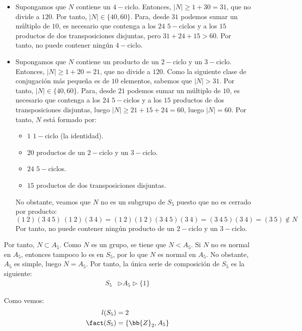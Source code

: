 \begin{ejercicio}
\begin{enumerate}
\begin{itemize}
            \item Supongamos que $N$ contiene un $4-$ciclo. Entonces, $|N|\geq 1+30=31$, que no divide a $120$. Por tanto, $|N|\in \{40,60\}$. Para, desde $31$ podemos sumar un múltiplo de $10$, es necesario que contenga a los $24$ $5-$ciclos y a los $15$ productos de dos transposiciones disjuntas, pero $31+24+15>60$. Por tanto, no puede contener ningún $4-$ciclo.
            

            \item Supongamos que $N$ contiene un producto de un $2-$ciclo y un $3-$ciclo. Entonces, $|N|\geq 1+20=21$, que no divide a $120$. Como la siguiente clase de conjugación más pequeña es de $10$ elementos, sabemos que $|N|>31$. Por tanto, $|N|\in \{40,60\}$. Para, desde $21$ podemos sumar un múltiplo de $10$, es necesario que contenga a los $24$ $5-$ciclos y a los $15$ productos de dos transposiciones disjuntas, luego $|N|\geq 21+15+24=60$, luego $|N|=60$. Por tanto, $N$ está formado por:
            \begin{itemize}
                \item $1$ $1-$ciclo (la identidad).
                \item $20$ productos de un $2-$ciclo y un $3-$ciclo.
                \item $24$ $5-$ciclos.
                \item $15$ productos de dos transposiciones disjuntas.
            \end{itemize}

            No obstante, veamos que $N$ no es un subgrupo de $S_5$ puesto que no es cerrado por producto:
            \begin{equation*}
                (1\ 2)(3\ 4\ 5)\ (1\ 2)(3\ 4) = (1\ 2)(1\ 2)(3\ 4\ 5)(3\ 4)
                = (3\ 4\ 5)(3\ 4) = (3\ 5)\notin N
            \end{equation*}
            Por tanto, no puede contener ningún producto de un $2-$ciclo y un $3-$ciclo.
        \end{itemize}
        Por tanto, $N\subset A_5$. Como $N$ es un grupo, se tiene que $N<A_5$. Si $N$ no es normal en $A_5$, entonces tampoco lo es en $S_5$, por lo que $N$ es normal en $A_5$. No obstante, $A_5$ es simple, luego $N=A_5$.
        Por tanto, la única serie de composición de $S_5$ es la siguiente:
        \begin{align*}
            S_5 &\rhd A_5 \rhd \{1\}
        \end{align*}

        Como vemos:
        \begin{align*}
            l(S_5) &= 2 \\
            \fact(S_5) &= \{\bb{Z}_2, A_5\}
        \end{align*}
    \end{enumerate}
\end{ejercicio}


